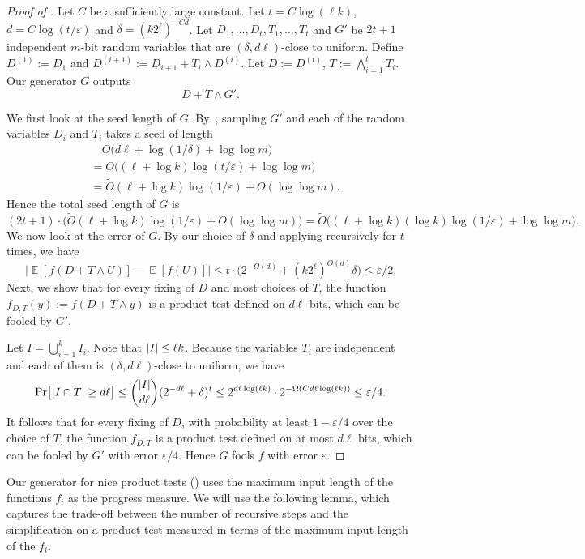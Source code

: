 \documentclass{toc}
\def\eps{\varepsilon}
\def\Blocklength{\ell}
\DeclarePairedDelimiter{\abs}{\lvert}{\rvert}
\DeclareMathOperator*{\E}{\mathbb{E}}                 %
\begin{document}
  \begin{proof}[Proof of {}]
    Let $C$ be a sufficiently large constant.
    Let $t = C\log(\Blocklength k)$, $d = C \log(t/\eps)$ and $\delta = (k2^\Blocklength)^{-Cd}$.
    Let $D_1, \ldots, D_t, T_1, \ldots, T_t$ and $G'$ be $2t+1$ independent 
    $m$-bit  %
    random variables
    that are $(\delta, d \Blocklength)$-close to uniform.
    Define $D^{(1)} := D_1$ and $D^{(i+1)} := D_{i+1} + T_i \wedge D^{(i)}$.
    Let $D := D^{(t)}$, $T := \bigwedge_{i=1}^t T_i$.
    Our generator $G$ outputs 
  	\[
  		D + T \wedge G' .
  	\]
  
    We first look at the seed length of $G$.
    By~\cite[Lemma~4.2]{NaorN93}, sampling $G'$ and each of the random variables $D_i$ and $T_i$ takes a seed of length
    \begin{align*}
      &\quad O \bigl( d \Blocklength + \log(1/\delta) + \log\log m \bigr) \\
      &= O \bigl((\Blocklength + \log k) \log(t/\eps) + \log\log m \bigr) \\
      &= \tilde O(\Blocklength + \log k) \log(1/\eps) + O(\log\log m).
    \end{align*}
    Hence the total seed length of $G$ is 
    \[
      (2t + 1) \cdot \bigl( \tilde O(\Blocklength + \log k) \log(1/\eps) + O(\log\log m) \bigr)
      = \tilde O \bigl( (\ell + \log k) (\log k) \log(1/\eps) + \log\log m \bigr) .
    \]
    \medskip
    We now look at the error of $G$.
    By our choice of $\delta$ and applying  recursively for $t$ times, we have
    \[
      \bigl| \E[f(D + T \wedge U)] - \E[f(U)] \bigr|
      \le t \cdot \bigl( 2^{-\Omega(d)} + (k 2^\Blocklength)^{O(d)} \delta \bigr)
      \le \eps/2 .
    \]
    Next, we show that for every fixing of $D$ and most choices of $T$, the function $f_{D,T}(y) := f(D + T \wedge y)$ is a product test defined on $d \Blocklength$ bits, which can be fooled by $G'$.
    
    Let $I = \bigcup_{i=1}^k I_i$.
    Note that $\abs{I} \le \Blocklength k$.
    Because the variables $T_i$ are independent and each of them is $(\delta, d \Blocklength)$-close to uniform, we have
    \[
      \Pr \bigl[ \abs{I \cap T} \ge d \Blocklength \bigr]
      \le \binom{\abs{I}}{d \Blocklength} (2^{-d \Blocklength} + \delta)^t
      \le 2^{d \Blocklength \log(\Blocklength k)} \cdot 2^{-\Omega(C d \Blocklength \log(\Blocklength k))} 
      \le \eps/4.
    \]
    It follows that for every fixing of $D$, with probability at least $1 - \eps/4$ over the choice of $T$, the function $f_{D,T}$ is a product test defined on at most $d \Blocklength$ bits, which can be fooled by $G'$ with error $\eps/4$.
    Hence $G$ fools $f$ with error $\eps$.
  \end{proof}
  Our generator for nice product tests () uses the maximum input length of the functions $f_i$ as the progress measure. 
  We will use the following lemma, which captures the trade-off between the number of recursive steps and the simplification on a product test measured in terms of the maximum input length of the $f_i$.
\end{document}
